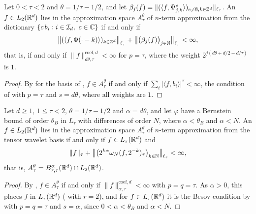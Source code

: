 \begin{theorem}
\label{thm:daub-rd-nterm-coeff}
\leanok
{}
Let $0 < \tau < 2$ and $\theta = 1/\tau - 1/2$, and let
$\beta_j(f) = \|(\langle f, \Psi^e_{j,k} \rangle)_{e \neq \emptyset, k \in \mathbb{Z}^d}\|_{\ell_\tau}$.
An $f \in L_2(\mathbb{R}^d)$ lies in the approximation space $A^\theta_\tau$ of $n$-term approximation
from the dictionary $\{c \, b_i : i \in \mathcal{I}_d, \ c \in \mathbb{C}\}$ if and only if
\[
  \bigl\|(\langle f, \Phi(\cdot - k) \rangle)_{k \in \mathbb{Z}^d}\bigr\|_{\ell_\tau}
  + \bigl\|\bigl(\beta_j(f)\bigr)_{j \in \mathbb{N}}\bigr\|_{\ell_\tau} < \infty ,
\]
that is, if and only if $\|f\|^{\mathrm{coef},d}_{d\theta,\tau} < \infty$ for $p = \tau$, where
the weight $2^{j(d\theta + d/2 - d/\tau)}$ is $1$.
\end{theorem}

\begin{proof}
\leanok
{}
By  for the basis of , $f \in A^\theta_\tau$
if and only if $\sum_i |\langle f, b_i \rangle|^\tau < \infty$, the condition of
 with $p = \tau$ and $s = d\theta$, where all weights are $1$.
\end{proof}

\begin{corollary}
\label{cor:daub-rd-nterm}
\leanok
{}
Let $d \geq 1$, $1 \leq \tau < 2$, $\theta = 1/\tau - 1/2$ and $\alpha = d\theta$, and let
$\varphi$ have a Bernstein bound of order $\theta_B$ in $L_\tau$ with differences of order $N$,
where $\alpha < \theta_B$ and $\alpha < N$. An $f \in L_2(\mathbb{R}^d)$ lies in the approximation space
$A^\theta_\tau$ of $n$-term approximation from the tensor wavelet basis if and only if
$f \in L_\tau(\mathbb{R}^d)$ and
\[
  \|f\|_\tau + \bigl\|\bigl(2^{k\alpha} \omega_N(f, 2^{-k})_\tau\bigr)_{k \in \mathbb{N}}
    \bigr\|_{\ell_\tau} < \infty ,
\]
that is, $A^\theta_\tau = B^{\alpha}_{\tau,\tau}(\mathbb{R}^d) \cap L_2(\mathbb{R}^d)$.
\end{corollary}

\begin{proof}
\leanok
{}
By , $f \in A^\theta_\tau$ if and only if
$\|f\|^{\mathrm{coef},d}_{\alpha,\tau} < \infty$ with $p = q = \tau$. As $\alpha > 0$, this
places $f$ in $L_\tau(\mathbb{R}^d)$ ( with $r = 2$), and for
$f \in L_\tau(\mathbb{R}^d)$ it is the Besov condition by  with $p = q = \tau$
and $s = \alpha$, since $0 < \alpha < \theta_B$ and $\alpha < N$.
\end{proof}

